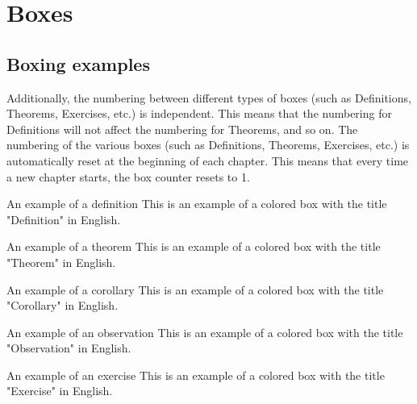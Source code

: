 \chapter{Boxes}
\section{Boxing examples}

Additionally, the numbering between different types of boxes (such as Definitions, Theorems, Exercises, etc.) is independent. This means that the numbering for Definitions will not affect the numbering for Theorems, and so on.
The numbering of the various boxes (such as Definitions, Theorems, Exercises, etc.) is automatically reset at the beginning of each chapter. This means that every time a new chapter starts, the box counter resets to 1.

\begin{definition}{An example of a definition}
  This is an example of a colored box with the title "Definition" in English.
\end{definition}

\begin{theorem}{An example of a theorem}
  This is an example of a colored box with the title "Theorem" in English.
\end{theorem}

\begin{corollary}{An example of a corollary}
  This is an example of a colored box with the title "Corollary" in English.
\end{corollary}

\begin{observation}{An example of an observation}
  This is an example of a colored box with the title "Observation" in English.
\end{observation}

\begin{exercise}{An example of an exercise}
  This is an example of a colored box with the title "Exercise" in English.
\end{exercise}
